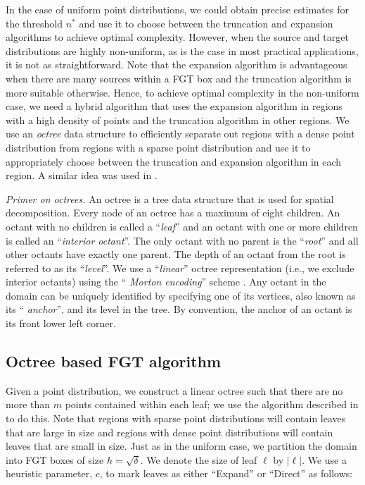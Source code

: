 
 In the case of uniform point distributions, we could obtain precise estimates for the threshold $n^*$ and use it to 
 choose between the truncation and expansion algorithms to achieve optimal complexity. However, when the source and 
 target distributions are highly non-uniform, as is the case in most practical applications, it is not as
 straightforward. Note that the expansion algorithm is advantageous when there are many sources within a FGT box and
 the truncation algorithm is more suitable otherwise. Hence, to achieve optimal complexity in the non-uniform case, we 
 need a hybrid algorithm that uses the expansion algorithm in regions with a high density of points and the 
 truncation algorithm in other regions. We use an {\em octree} \cite{clr90} data structure to efficiently
 separate out regions with a dense point distribution from regions with a sparse point distribution and use
 it to appropriately choose between the truncation and expansion algorithm in each region. A similar idea was
 used in \cite{veerapaneni08}. 
 
{\em Primer on octrees.} An octree is a tree data structure that is used for spatial decomposition. Every
node of an octree has a maximum of eight children. An octant with no children is
called a ``{\em leaf}'' and an octant with one or more children is
called an ``{\em interior octant}''. The only octant with no parent is the
 ``{\em root}'' and all other octants have exactly one parent. The depth of an octant 
 from the root is referred to as its ``{\em level}''. We use a ``{\em linear}'' octree
representation (i.e., we exclude interior octants) using the ``{\em
Morton encoding}'' scheme \cite{morton66}. Any octant in the domain can be uniquely
identified by specifying one of its vertices, also known as its ``{\em
anchor}'', and its level in the tree. By convention, the anchor of an
octant is its front lower left corner. 

\subsection{Octree based FGT algorithm}
\label{sc:octreefgt}

 Given a point distribution, we construct a linear octree such that there are no more than $m$ points contained within each leaf; we
 use the algorithm described in \cite{octPaper08} to do this. Note that regions with sparse point distributions will contain 
 leaves that are large in size and regions with dense point distributions will contain leaves that are small in size. Just as in 
 the uniform case, we partition the domain into FGT boxes of size $h = \sqrt{\delta}$. We denote the size of leaf $\ell$ by $|\ell|$.
 We use a heuristic parameter, $c$, to mark leaves as either ``Expand'' or ``Direct'' as follows:

